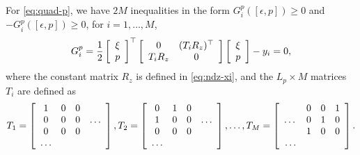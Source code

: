 \documentclass[11pt, onecolumn]{article}
\begin{document}
For \eqref{eq:quad-p}, we have $2M$ inequalities in the form $G_i^p([\epsilon,p]) \ge 0$ and
$-G_i^p([\epsilon,p]) \ge 0$, for $i=1,\dots, M$,
\begin{align*}
  G_i^p = {1\over 2}\left[ \begin{array}[c]{c} \xi\\ p \end{array} \right]^\top
  \left[ \begin{array}[c]{cc} 0 & (T_i R_z)^\top \\ T_i R_z & 0  \end{array} \right]
  \left[ \begin{array}[c]{c} \xi \\p \end{array} \right] - y_i = 0,
\end{align*}
where the constant matrix $R_z$ is defined in \eqref{eq:ndz-xi}, and the $L_p\times M$ matrices
$T_i$ are defined as
\begin{align}
  \label{eq:def-Ti}
  T_1 = \left[ \begin{array}[c]{cccc} 1 & 0 & 0 & \\ 0&0&0&\dots \\ 0&0&0& \\ \dots \end{array} \right],
  T_2 = \left[ \begin{array}[c]{cccc} 0 & 1 & 0 & \\ 1&0&0&\dots \\ 0&0&0& \\ \dots\end{array} \right],
  \dots,
  T_M = \left[ \begin{array}[c]{cccc} &0 & 0 & 1  \\ \dots&0&1&0 \\ &1&0&0 \\ \dots\end{array} \right].
\end{align}
\end{document}
